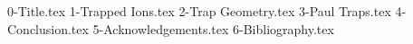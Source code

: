 \documentclass[%
 reprint,
 amsmath,amssymb,
 aps,
]{revtex4-2}
\begin{document}

{0-Title.tex}
{1-Trapped Ions.tex}
{2-Trap Geometry.tex}
{3-Paul Traps.tex}
{4-Conclusion.tex}
{5-Acknowledgements.tex}
{6-Bibliography.tex}
\end{document}
